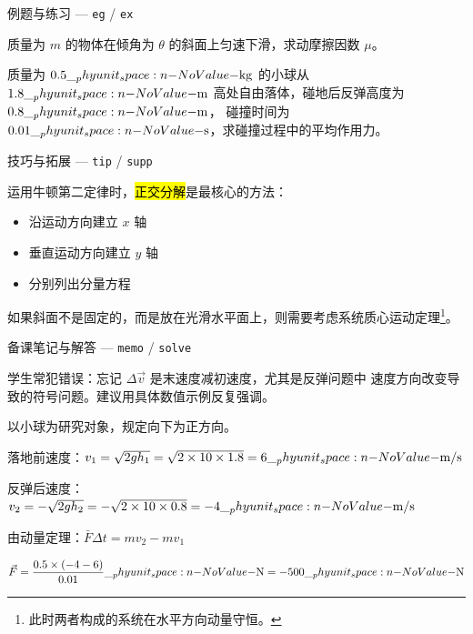 \documentclass[darkmode=false, randomquote=true, quoteseed=2026, shownav=false,handout=false]{HiBeamer}
\begin{document}
\begin{frame}{例题与练习 --- \texttt{eg} / \texttt{ex}}
  \begin{eg}[斜面问题]
    质量为 $m$ 的物体在倾角为 $\theta$ 的斜面上匀速下滑，求动摩擦因数 $\mu$。
  \end{eg}
\vfil
  \begin{ex}[变力问题]
    质量为 $0.5\Ukg$ 的小球从 $1.8\Um$ 高处自由落体，碰地后反弹高度为 $0.8\Um$，
    碰撞时间为 $0.01\Us$，求碰撞过程中的平均作用力。
  \end{ex}
\end{frame}

\begin{frame}{技巧与拓展 --- \texttt{tip} / \texttt{supp}}
  \begin{tip}[解题技巧]
    运用牛顿第二定律时，\hl{正交分解}是最核心的方法：
    \begin{itemize}
      \item 沿运动方向建立 $x$ 轴
      \item 垂直运动方向建立 $y$ 轴
      \item 分别列出分量方程
    \end{itemize}
  \end{tip}
\vfil
  \begin{supp}[拓展知识]
    如果斜面不是固定的，而是放在光滑水平面上，则需要考虑系统质心运动定理\footnote{此时两者构成的系统在水平方向动量守恒。}。
  \end{supp}
\end{frame}

\begin{frame}{备课笔记与解答 --- \texttt{memo} / \texttt{solve}}
  \begin{memo}[备课笔记]
    学生常犯错误：忘记 $\Delta \vec{v}$ 是末速度减初速度，尤其是反弹问题中
    速度方向改变导致的符号问题。建议用具体数值示例反复强调。
  \end{memo}

  \begin{solve}
    以小球为研究对象，规定向下为正方向。

    落地前速度：$v_1 = \sqrt{2gh_1} = \sqrt{2 \times 10 \times 1.8} = 6\Ums$

    反弹后速度：$v_2 = -\sqrt{2gh_2} = -\sqrt{2 \times 10 \times 0.8} = -4\Ums$

    由动量定理：$\bar{F}\Delta t = m v_2 - m v_1$

    $\vec{F} = \dfrac{0.5 \times (-4 - 6)}{0.01} \UN= -500\UN$
  \end{solve}
\end{frame}
\end{document}
